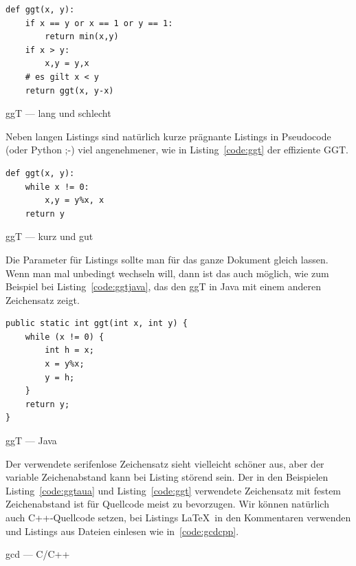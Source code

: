 \documentclass[11pt,a4paper]{report}
\begin{document}
\begin{listing}[ht]
\begin{lstlisting}
def ggt(x, y):
    if x == y or x == 1 or y == 1:
        return min(x,y)
    if x > y:
        x,y = y,x
    # es gilt x < y
    return ggt(x, y-x)
\end{lstlisting}
\caption{ggT --- lang und schlecht}
\label{code:ggtaua}
\end{listing}

Neben langen Listings sind natürlich kurze prägnante
Listings in Pseudocode (oder Python ;-) viel 
angenehmener, wie in Listing~\ref{code:ggt} der
effiziente GGT.

\begin{listing}[htbp]
\begin{lstlisting}
def ggt(x, y):
    while x != 0:
        x,y = y%x, x
    return y
\end{lstlisting}
\caption{ggT --- kurz und gut}
\label{code:ggt}
\end{listing}

Die Parameter für Listings sollte man für das ganze Dokument gleich 
lassen. 
Wenn man mal unbedingt wechseln will, dann ist das auch möglich,
wie zum Beispiel bei Listing~\ref{code:ggtjava}, das den ggT
in Java mit einem anderen Zeichensatz zeigt.

\begin{listing}[htbp]
\lstset{basicstyle=\sffamily, columns=[l]flexible, mathescape=true, showstringspaces=true, numbers=none, language=java}
\begin{lstlisting}
public static int ggt(int x, int y) {
    while (x != 0) {
        int h = x;
        x = y%x;
        y = h;
    }
    return y;
}
\end{lstlisting}
\caption{ggT --- Java}
\label{code:ggtjava}
\end{listing}

Der verwendete serifenlose Zeichensatz sieht vielleicht schöner 
aus, aber der variable Zeichenabstand kann bei Listing störend 
sein. Der in den Beispielen Listing~\ref{code:ggtaua} und 
Listing~\ref{code:ggt} verwendete Zeichensatz mit festem
Zeichenabstand ist für Quellcode meist zu bevorzugen.
Wir können natürlich auch C++-Quellcode setzen, bei Listings
\LaTeX\ in den Kommentaren verwenden und Listings aus
Dateien einlesen wie in~\ref{code:gcdcpp}.

\begin{listing}[htbp]
  \lstset{basicstyle=\ttfamily, columns=[l]flexible, mathescape=true, numbers=left, language=c++}
  
\caption{gcd --- C/C++}
\label{code:gcdcpp}
\end{listing}
\end{document}

